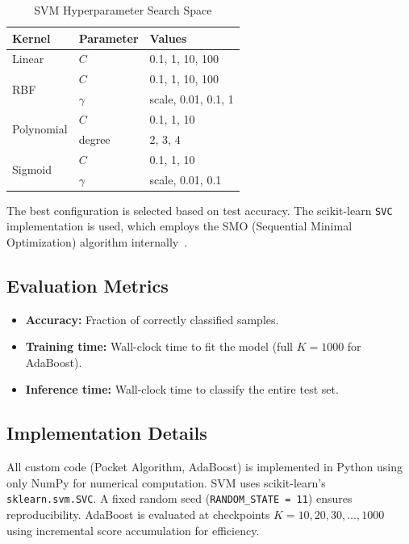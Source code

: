 \documentclass{acm_proc_article-sp}
\begin{document}
\begin{table}[H]
\centering
\caption{SVM Hyperparameter Search Space}
\label{tab:svm-grid}
\begin{tabular}{l l l}
\toprule
\textbf{Kernel} & \textbf{Parameter} & \textbf{Values} \\
\midrule
Linear & $C$ & 0.1, 1, 10, 100 \\
\midrule
\multirow{2}{*}{RBF} & $C$ & 0.1, 1, 10, 100 \\
 & $\gamma$ & scale, 0.01, 0.1, 1 \\
\midrule
\multirow{2}{*}{Polynomial} & $C$ & 0.1, 1, 10 \\
 & degree & 2, 3, 4 \\
\midrule
\multirow{2}{*}{Sigmoid} & $C$ & 0.1, 1, 10 \\
 & $\gamma$ & scale, 0.01, 0.1 \\
\bottomrule
\end{tabular}
\end{table}

The best configuration is selected based on test accuracy. The scikit-learn \texttt{SVC} implementation is used, which employs the SMO (Sequential Minimal Optimization) algorithm internally~\cite{platt1998}.

\subsection{Evaluation Metrics}

\begin{itemize}
\item \textbf{Accuracy:} Fraction of correctly classified samples.
\item \textbf{Training time:} Wall-clock time to fit the model (full $K\!=\!1000$ for AdaBoost).
\item \textbf{Inference time:} Wall-clock time to classify the entire test set.
\end{itemize}

\subsection{Implementation Details}

All custom code (Pocket Algorithm, AdaBoost) is implemented in Python using only NumPy for numerical computation. SVM uses scikit-learn's \texttt{sklearn.svm.SVC}. A fixed random seed (\texttt{RANDOM\_STATE = 11}) ensures reproducibility. AdaBoost is evaluated at checkpoints $K = 10, 20, 30, \ldots, 1000$ using incremental score accumulation for efficiency.
\end{document}
